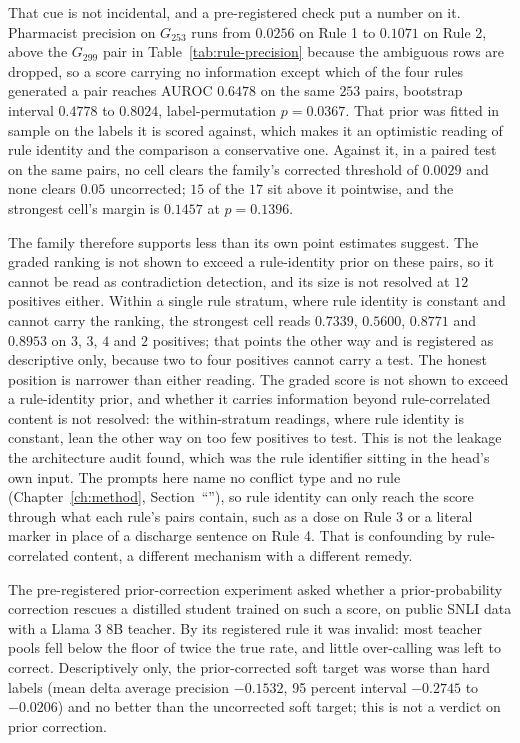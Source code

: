 That cue is not incidental, and a pre-registered check put a number on it. Pharmacist precision on $G_{253}$ runs
from $0.0256$ on Rule 1 to $0.1071$ on Rule 2, above the $G_{299}$ pair in
Table~\ref{tab:rule-precision} because the ambiguous rows are dropped, so a score carrying no information except which of the
four rules generated a pair reaches AUROC $0.6478$ on the same $253$ pairs, bootstrap interval
$0.4778$ to $0.8024$, label-permutation $p = 0.0367$. That prior was fitted in sample on the labels it
is scored against, which makes it an optimistic reading of rule identity and the comparison a
conservative one. Against it, in a paired test on the same pairs, no cell clears the family's
corrected threshold of $0.0029$ and none clears $0.05$ uncorrected; $15$ of the $17$ sit above it
pointwise, and the strongest cell's margin is $0.1457$ at $p = 0.1396$.

The family therefore supports less than its own point estimates suggest. The graded ranking is not
shown to exceed a rule-identity prior on these pairs, so it cannot be read as contradiction
detection, and its size is not resolved at $12$ positives either. Within a single rule stratum,
where rule identity is constant and cannot carry the ranking, the strongest cell reads $0.7339$,
$0.5600$, $0.8771$ and $0.8953$ on $3$, $3$, $4$ and $2$ positives; that points the other way and is
registered as descriptive only, because two to four positives cannot carry a test. The honest
position is narrower than either reading. The graded score is not shown to exceed a rule-identity
prior, and whether it carries information beyond rule-correlated content is not resolved: the
within-stratum readings, where rule identity is constant, lean the other way on too few positives
to test. This is not the leakage the architecture audit found, which was the rule identifier sitting
in the head's own input. The prompts here name no conflict type and no rule
(Chapter~\ref{ch:method}, Section~``''), so rule identity can only reach the
score through what each rule's pairs contain, such as a dose on Rule 3 or a literal marker in place
of a discharge sentence on Rule 4. That is confounding by rule-correlated content, a different
mechanism with a different remedy.

The pre-registered prior-correction experiment asked whether a prior-probability
correction rescues a distilled student trained on such a score, on public
SNLI data with a Llama 3 8B teacher. By its registered rule it was invalid: most teacher pools fell below the
floor of twice the true rate, and little over-calling was left to
correct. Descriptively only, the prior-corrected soft target was worse than
hard labels (mean delta average precision $-0.1532$, 95 percent interval $-0.2745$ to $-0.0206$) and no better than the uncorrected soft target; this is
not a verdict on prior correction.

